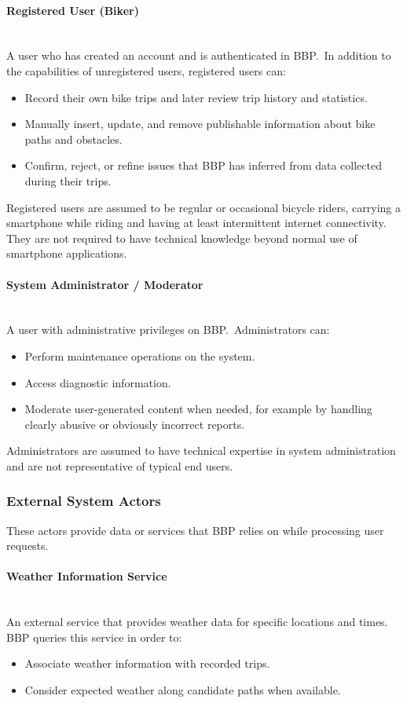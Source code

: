 \paragraph{Registered User (Biker)}
\mbox{}\\
A user who has created an account and is authenticated in BBP.\ In addition to the capabilities of unregistered users, registered users can:
\begin{itemize}[nosep,leftmargin=1.4em]
    \item Record their own bike trips and later review trip history and statistics.
    \item Manually insert, update, and remove publishable information about bike paths and obstacles.
    \item Confirm, reject, or refine issues that BBP has inferred from data collected during their trips.
\end{itemize}
Registered users are assumed to be regular or occasional bicycle riders, carrying a smartphone while riding and having at least intermittent internet connectivity. They are not required to have technical knowledge beyond normal use of smartphone applications.

\paragraph{System Administrator / Moderator}
\mbox{}\\
A user with administrative privileges on BBP.\ Administrators can:
\begin{itemize}[nosep,leftmargin=1.4em]
    \item Perform maintenance operations on the system.
    \item Access diagnostic information.
    \item Moderate user-generated content when needed, for example by handling clearly abusive or obviously incorrect reports.
\end{itemize}
Administrators are assumed to have technical expertise in system administration and are not representative of typical end users.

\subsubsection{External System Actors}
These actors provide data or services that BBP relies on while processing user requests.

\paragraph{Weather Information Service}
\mbox{}\\
An external service that provides weather data for specific locations and times. BBP queries this service in order to:
\begin{itemize}[nosep,leftmargin=1.4em]
    \item Associate weather information with recorded trips.
    \item Consider expected weather along candidate paths when available.
\end{itemize}

